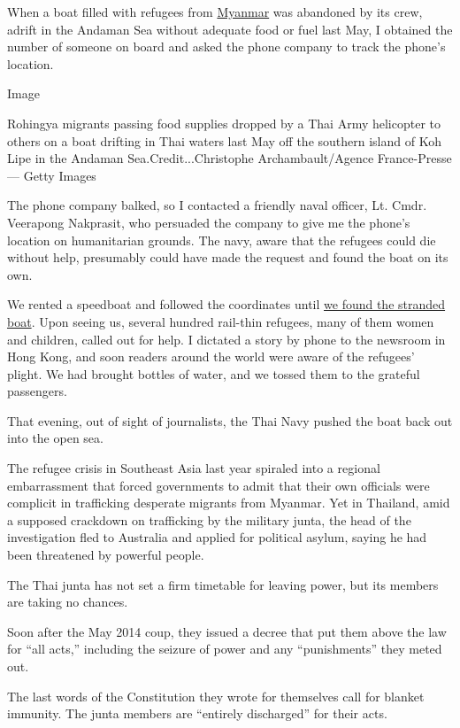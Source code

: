 When a boat filled with refugees from
\href{http://topics.nytimes.com/top/news/international/countriesandterritories/myanmar/index.html?inline=nyt-geo}{Myanmar}
was abandoned by its crew, adrift in the Andaman Sea without adequate
food or fuel last May, I obtained the number of someone on board and
asked the phone company to track the phone's location.

Image

Rohingya migrants passing food supplies dropped by a Thai Army
helicopter to others on a boat drifting in Thai waters last May off the
southern island of Koh Lipe in the Andaman Sea.Credit...Christophe
Archambault/Agence France-Presse --- Getty Images

The phone company balked, so I contacted a friendly naval officer, Lt.
Cmdr. Veerapong Nakprasit, who persuaded the company to give me the
phone's location on humanitarian grounds. The navy, aware that the
refugees could die without help, presumably could have made the request
and found the boat on its own.

We rented a speedboat and followed the coordinates until
\href{http://www.nytimes.com/2015/05/15/world/asia/burmese-rohingya-bangladeshi-migrants-andaman-sea.html}{we
found the stranded boat}. Upon seeing us, several hundred rail-thin
refugees, many of them women and children, called out for help. I
dictated a story by phone to the newsroom in Hong Kong, and soon readers
around the world were aware of the refugees' plight. We had brought
bottles of water, and we tossed them to the grateful passengers.

That evening, out of sight of journalists, the Thai Navy pushed the boat
back out into the open sea.

The refugee crisis in Southeast Asia last year spiraled into a regional
embarrassment that forced governments to admit that their own officials
were complicit in trafficking desperate migrants from Myanmar. Yet in
Thailand, amid a supposed crackdown on trafficking by the military
junta, the head of the investigation fled to Australia and applied for
political asylum, saying he had been threatened by powerful people.

The Thai junta has not set a firm timetable for leaving power, but its
members are taking no chances.

Soon after the May 2014 coup, they issued a decree that put them above
the law for ``all acts,'' including the seizure of power and any
``punishments'' they meted out.

The last words of the Constitution they wrote for themselves call for
blanket immunity. The junta members are ``entirely discharged'' for
their acts.

